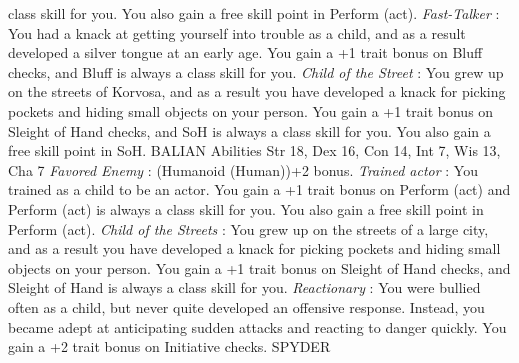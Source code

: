 class skill for you. You also gain a free skill point in Perform (act).   {\itshape Fast-Talker} : You had a knack at getting yourself into trouble as a child, and as a result developed a silver tongue at an early age. You gain a +1 trait bonus on Bluff checks, and Bluff is always a class skill for you.   {\itshape Child of the Street} : You grew up on the streets of Korvosa, and as a result you have developed a knack for picking pockets and hiding small objects on your person. You gain a +1 trait bonus on Sleight of Hand checks, and SoH is always a class skill for you. You also gain a free skill point in SoH. BALIAN         Abilities Str 18, Dex 16, Con 14, Int 7, Wis 13, Cha 7    {\itshape Favored Enemy} : (Humanoid (Human))+2 bonus.   {\itshape Trained actor} : You trained as a child to be an actor. You gain a +1 trait bonus on Perform (act) and Perform (act) is always a class skill for you. You also gain a free skill point in Perform (act).   {\itshape Child of the Streets} : You grew up on the streets of a large city, and as a result you have developed a knack for picking pockets and hiding small objects on your person. You gain a +1 trait bonus on Sleight of Hand checks, and Sleight of Hand is always a class skill for you.   {\itshape Reactionary} : You were bullied often as a child, but never quite developed an offensive response. Instead, you became adept at anticipating sudden attacks and reacting to danger quickly. You gain a +2 trait bonus on Initiative checks. SPYDER            